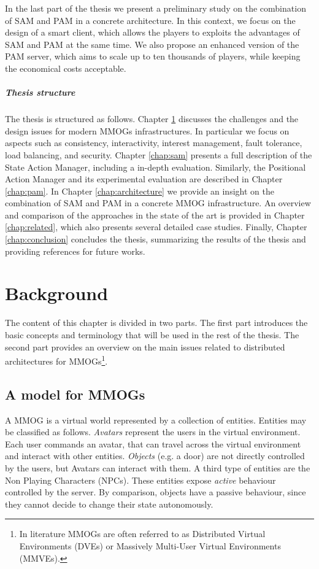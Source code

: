 \documentclass[final,10pt,a5paper]{phdimt}
\theoremstyle{definition}
\begin{document}
In the last part of the thesis we present a preliminary study on the combination of SAM and PAM in a concrete architecture.
In this context, we focus on the design of a smart client, which allows the players to exploits the advantages of SAM and PAM at the same time. We also propose an enhanced version of the PAM server, which aims to scale up to ten thousands of players, while keeping the economical costs acceptable. 

\paragraph{Thesis structure}
The thesis is structured as follows.
Chapter \ref{chap:background} discusses the challenges and the design issues for modern MMOGs infrastructures. In particular we focus on aspects such as consistency, interactivity, interest management, fault tolerance, load balancing, and security.
Chapter \ref{chap:sam} presents a full description of the State Action Manager, including a in-depth evaluation.
Similarly, the Positional Action Manager and its experimental evaluation are described in Chapter \ref{chap:pam}.
In Chapter \ref{chap:architecture} we provide an insight on the combination of SAM and PAM in a concrete MMOG infrastructure.
An overview and comparison of the approaches in the state of the art is provided in Chapter \ref{chap:related}, which also presents several detailed case studies.
Finally, Chapter \ref{chap:conclusion} concludes the thesis, summarizing the results of the thesis and providing references for future works.
\clearpage{}
\clearpage{}
\chapter{Background}
\label{chap:background}

The content of this chapter is divided in two parts.
The first part introduces the basic concepts and terminology that will be used in the rest of the thesis.
The second part provides an overview on the main issues related to distributed architectures for MMOGs\footnote{In literature MMOGs are often referred to as Distributed Virtual Environments (DVEs) or Massively Multi-User Virtual Environments (MMVEs).}.



\section{A model for MMOGs}

A MMOG is a virtual world represented by a collection of entities. 
Entities may be classified as follows.
\textit{Avatars} represent the users in the virtual environment.
Each user commands an avatar, that can travel across the virtual environment and interact with other entities.
\textit{Objects} (e.g. a door) are not directly controlled by the users, but Avatars can interact with them.
A third type of entities are the Non Playing Characters (NPCs).
These entities expose \textit{active} behaviour controlled by the server.
By comparison, objects have a passive behaviour, since they cannot decide to change their state autonomously.
\end{document}
